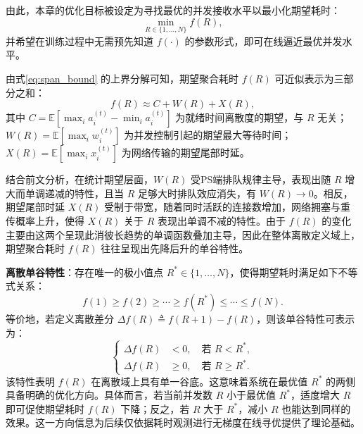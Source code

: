 \documentclass[master, vlined]{DissertUESTC}
\begin{document}
	由此，本章的优化目标被设定为寻找最优的并发接收水平以最小化期望耗时：
	\begin{equation}
		\min_{R\in\{1,\dots,N\}} f(R),
	\label{eq:min_obj}
	\end{equation}
	并希望在训练过程中无需预先知道 $f(\cdot)$ 的参数形式，即可在线逼近最优并发水平。

	由式\eqref{eq:span_bound} 的上界分解可知，期望聚合耗时 $f(R)$ 可近似表示为三部分之和：
	\begin{equation}
		f(R) \approx C + W(R) + X(R),
		\label{eq:decomp_approx}
	\end{equation}
	其中 $C = \mathbb{E}\!\left[\max_i a_i^{(t)} - \min_i a_i^{(t)}\right]$ 为就绪时间离散度的期望，与 $R$ 无关；$W(R)=\mathbb{E}\!\left[\max_i w_i^{(t)}\right]$ 为并发控制引起的期望最大等待时间；$X(R)=\mathbb{E}\!\left[\max_i x_i^{(t)}\right]$ 为网络传输的期望尾部时延。

	结合前文分析，在统计期望层面，$W(R)$ 受PS端排队规律主导，表现出随 $R$ 增大而单调递减的特性，且当 $R$ 足够大时排队效应消失，有 $W(R)\to0$。相反，期望尾部时延 $X(R)$ 受制于带宽，随着同时活跃的连接数增加，网络拥塞与重传概率上升，使得 $X(R)$ 关于 $R$ 表现出单调不减的特性。由于 $f(R)$ 的变化主要由这两个呈现此消彼长趋势的单调函数叠加主导，因此在整体离散定义域上，期望聚合耗时 $f(R)$ 往往呈现出先降后升的单谷特性。

	\textbf{离散单谷特性}：存在唯一的极小值点 $R^*\in\{1,\dots,N\}$，使得期望耗时满足如下不等式关系：
	\begin{equation}
		f(1)\ge f(2)\ge \cdots \ge f(R^*) \le \cdots \le f(N).
	\label{eq:unimodal}
	\end{equation}
	等价地，若定义离散差分 $\Delta f(R) \triangleq f(R+1)-f(R)$，则该单谷特性可表示为：
	\begin{equation}
		\left\{
		\begin{aligned}
			\Delta f(R) &< 0, \quad \text{若 } R < R^*, \\
			\Delta f(R) &\ge 0, \quad \text{若 } R \ge R^*.
		\end{aligned}
		\right.
	\label{eq:diff_sign}
	\end{equation}
	该特性表明 $f(R)$ 在离散域上具有单一谷底。这意味着系统在最优值 $R^*$ 的两侧具备明确的优化方向。具体而言，若当前并发数 $R$ 小于最优值 $R^*$，适度增大 $R$ 即可促使期望耗时 $f(R)$ 下降；反之，若 $R$ 大于 $R^*$，减小 $R$ 也能达到同样的效果。这一方向信息为后续仅依据耗时观测进行无梯度在线寻优提供了理论基础。
\end{document}

